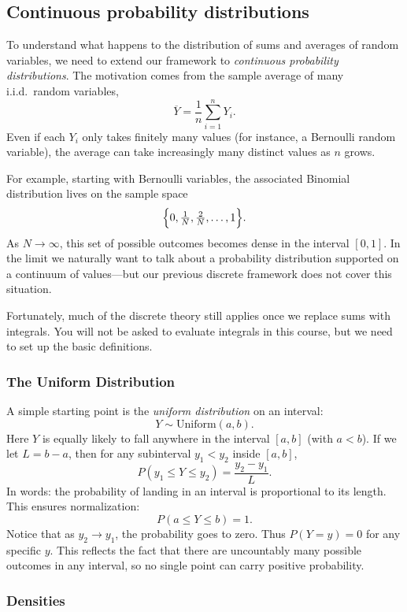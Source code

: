  \subsection{Continuous probability distributions}
To understand what happens to the distribution of sums and averages of random variables, we need to extend our framework to \emph{continuous probability distributions}. The motivation comes from the sample average of many i.i.d.\ random variables,  
\[
\overline{Y} = \frac{1}{n}\sum_{i=1}^n Y_i.
\]  
Even if each \(Y_i\) only takes finitely many values (for instance, a Bernoulli random variable), the average can take increasingly many distinct values as \(n\) grows.  

For example, starting with Bernoulli variables, the associated Binomial distribution lives on the sample space  
\[
\Bigl\{0,\tfrac{1}{N},\tfrac{2}{N},\dots,1\Bigr\}.
\]  
As \(N \to \infty\), this set of possible outcomes becomes dense in the interval \([0,1]\). In the limit we naturally want to talk about a probability distribution supported on a continuum of values---but our previous discrete framework does not cover this situation.  

Fortunately, much of the discrete theory still applies once we replace sums with integrals. You will not be asked to evaluate integrals in this course, but we need to set up the basic definitions.  



\subsubsection*{The Uniform Distribution}

A simple starting point is the \emph{uniform distribution} on an interval:  
\[
Y \sim \text{Uniform}(a,b).
\]  
Here \(Y\) is equally likely to fall anywhere in the interval \([a,b]\) (with \(a<b\)). If we let \(L = b-a\), then for any subinterval \(y_1 < y_2\) inside \([a,b]\),  
\[
P(y_1 \le Y \le y_2) = \frac{y_2-y_1}{L}.
\]  
In words: the probability of landing in an interval is proportional to its length. This ensures normalization:  
\[
P(a \le Y \le b) = 1.
\]  
Notice that as \(y_2 \to y_1\), the probability goes to zero. Thus \(P(Y=y)=0\) for any specific \(y\). This reflects the fact that there are uncountably many possible outcomes in any interval, so no single point can carry positive probability.  



\subsubsection*{Densities}

